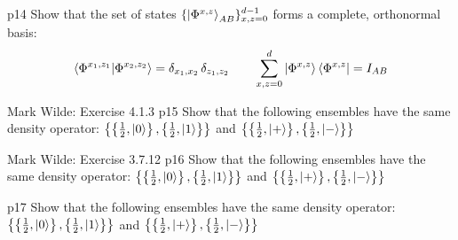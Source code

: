 \documentclass[a4paper, 11pt]{article}
\begin{document}
\begin{problem}{%
	}{p14%
	}
	Show that the set of states $\{\ket{\Phi^{x,z}}_{AB}\}^{d-1}_{x,z=0}$ forms a complete, orthonormal basis:$$\bra{\Phi^{x_1,z_1}}\ket{\Phi^{x_2,z_2}}=\delta_{x_1,x_2}\,\delta_{z_1,z_2}\qquad \sum_{x,z=0}^d\ket{\Phi^{x,z}}\bra{\Phi^{x,z}}=I_{AB}$$
\end{problem}


\begin{problem}{%
		Mark Wilde: Exercise 4.1.3
	}{p15%
	}
	Show that the following ensembles have the same density operator: $\left\{\left\{\frac12,\ket{0}\right\},\left\{\frac12,\ket{1}\right\}\right\}$ and $\left\{\left\{\frac12,\ket{+}\right\},\left\{\frac12,\ket{-}\right\}\right\}$
\end{problem}


\begin{problem}{%
		Mark Wilde: Exercise 3.7.12
	}{p16%
	}
	Show that the following ensembles have the same density operator: $\left\{\left\{\frac12,\ket{0}\right\},\left\{\frac12,\ket{1}\right\}\right\}$ and $\left\{\left\{\frac12,\ket{+}\right\},\left\{\frac12,\ket{-}\right\}\right\}$
\end{problem}


\begin{problem}{%
	}{p17%
	}
	Show that the following ensembles have the same density operator: $\left\{\left\{\frac12,\ket{0}\right\},\left\{\frac12,\ket{1}\right\}\right\}$ and $\left\{\left\{\frac12,\ket{+}\right\},\left\{\frac12,\ket{-}\right\}\right\}$
\end{problem}
\end{document}
